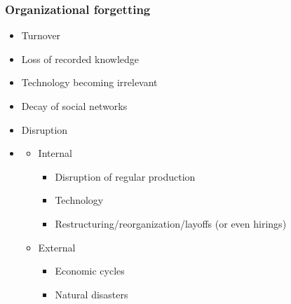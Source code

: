 \begin{frame}
	\frametitle{Organizational forgetting}
	\begin{itemize}
		\item Turnover \citep{DeHolan2004,Rao2006}
		\item Loss of recorded knowledge
		\item Technology becoming irrelevant
		\item Decay of social networks \citep{Argote2013_3,Argote1990,Thompson2007}
		\item Disruption
		\item 
		\begin{itemize}
			\item Internal
				\begin{itemize}
					\item Disruption of regular production 
					\item Technology \citep{Amburgey1993,Edmondson2001}
					\item Restructuring/reorganization/layoffs (or even hirings) \citep{Benkard2000,Anderson2014}
				\end{itemize}
			\item External
				\begin{itemize}
					\item Economic cycles \citep{Rockart2019}
					\item Natural disasters \citep{Anderson2014}
				\end{itemize}
		\end{itemize}
	\end{itemize}
\end{frame}



